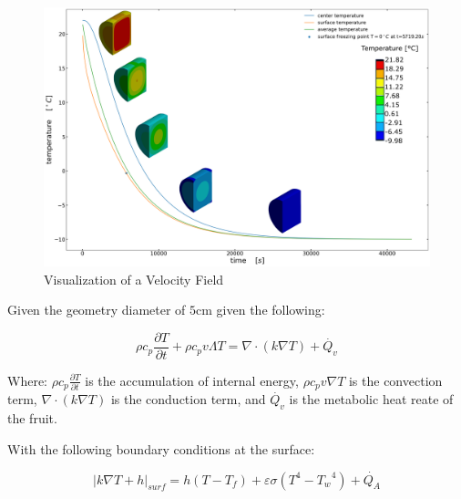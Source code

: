 \documentclass{article}
\begin{document}
\begin{figure}[h!]
	\centering
	\includegraphics[width=1.00\textwidth]{./cylinderTemps.png}
	\caption{Visualization of a Velocity Field}
	\label{img:cylinderTemps}
\end{figure}

Given the geometry diameter of $5 \textrm{cm}$ given the following:

\begin{dmath}
\rho c_p \frac{\partial T}{\partial t} + \rho c_p v \Lambda T = \nabla \cdot (k \nabla T) + \dot{Q_v}
\end{dmath}

Where: $\displaystyle \rho c_p \frac{\partial T}{\partial t}$ is the accumulation of internal energy, $\displaystyle \rho c_p v \nabla T$ is the convection term, $\displaystyle \nabla \cdot (k \nabla T)$ is the conduction term, and $\displaystyle \dot{Q_v}$ is the metabolic heat reate of the fruit.

With the following boundary conditions at the surface:

\begin{dmath}
\left| k \nabla T + h \right|_{surf} = h (T - T_f) + \varepsilon \sigma (T^4 - {T_w}^4) + \dot{Q_A}
\end{dmath}

\printbibliography[title={References}]
\end{document}
